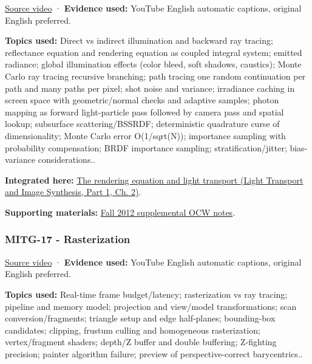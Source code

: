 \href{https://www.youtube.com/watch?v=xjBwPxU7tUk}{Source video} · \textbf{Evidence used:} YouTube English automatic captions, original English preferred.

\textbf{Topics used:} Direct vs indirect illumination and backward ray tracing; reflectance equation and rendering equation as coupled integral system; emitted radiance; global illumination effects (color bleed, soft shadows, caustics); Monte Carlo ray tracing recursive branching; path tracing one random continuation per path and many paths per pixel; shot noise and variance; irradiance caching in screen space with geometric/normal checks and adaptive samples; photon mapping as forward light-particle pass followed by camera pass and spatial lookup; subsurface scattering/BSSRDF; deterministic quadrature curse of dimensionality; Monte Carlo error O(1/sqrt(N)); importance sampling with probability compensation; BRDF importance sampling; stratification/jitter; bias-variance considerations..

\textbf{Integrated here:} \href{../04-Light-Transport-and-Image-Synthesis-P01/main.pdf\#03-visual-computing-i-ch007-the-rendering-equation-and-light-transport}{The rendering equation and light transport (Light Transport and Image Synthesis, Part 1, Ch. 2)}.

\textbf{Supporting materials:} \href{https://ocw.mit.edu/courses/6-837-computer-graphics-fall-2012/pages/lecture-notes/}{Fall 2012 supplemental OCW notes}.

\subsubsection{MITG-17 - Rasterization}\label{04-visual-computing-ii-ch036-mitg-17---rasterization}

\hypertarget{04-visual-computing-ii-ch036-mitg-17---rasterization}{}

\href{https://www.youtube.com/watch?v=aCTEiX59ERM}{Source video} · \textbf{Evidence used:} YouTube English automatic captions, original English preferred.

\textbf{Topics used:} Real-time frame budget/latency; rasterization vs ray tracing; pipeline and memory model; projection and view/model transformations; scan conversion/fragments; triangle setup and edge half-planes; bounding-box candidates; clipping, frustum culling and homogeneous rasterization; vertex/fragment shaders; depth/Z buffer and double buffering; Z-fighting precision; painter algorithm failure; preview of perspective-correct barycentrics..

